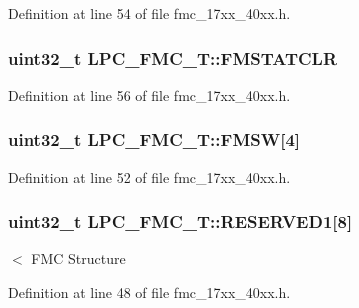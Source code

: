 Definition at line 54 of file fmc\+\_\+17xx\+\_\+40xx.\+h.

\subsubsection[{\texorpdfstring{F\+M\+S\+T\+A\+T\+C\+LR}{FMSTATCLR}}]{ uint32\+\_\+t L\+P\+C\+\_\+\+F\+M\+C\+\_\+\+T\+::\+F\+M\+S\+T\+A\+T\+C\+LR}\hypertarget{structLPC__FMC__T_a5cb3139486ee475934461686aa247ef5}{}\label{structLPC__FMC__T_a5cb3139486ee475934461686aa247ef5}


Definition at line 56 of file fmc\+\_\+17xx\+\_\+40xx.\+h.

\subsubsection[{\texorpdfstring{F\+M\+SW}{FMSW}}]{ uint32\+\_\+t L\+P\+C\+\_\+\+F\+M\+C\+\_\+\+T\+::\+F\+M\+SW\mbox{[}4\mbox{]}}\hypertarget{structLPC__FMC__T_a00273f3f32e8eeff8dd8e384ef2c8199}{}\label{structLPC__FMC__T_a00273f3f32e8eeff8dd8e384ef2c8199}


Definition at line 52 of file fmc\+\_\+17xx\+\_\+40xx.\+h.

\subsubsection[{\texorpdfstring{R\+E\+S\+E\+R\+V\+E\+D1}{RESERVED1}}]{ uint32\+\_\+t L\+P\+C\+\_\+\+F\+M\+C\+\_\+\+T\+::\+R\+E\+S\+E\+R\+V\+E\+D1\mbox{[}8\mbox{]}}\hypertarget{structLPC__FMC__T_a17b10ffb216f33f76e0984f1bb97c3dd}{}\label{structLPC__FMC__T_a17b10ffb216f33f76e0984f1bb97c3dd}
$<$ F\+MC Structure 

Definition at line 48 of file fmc\+\_\+17xx\+\_\+40xx.\+h.

